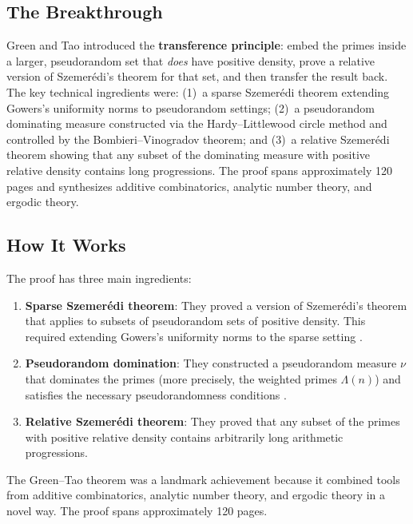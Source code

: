 \subsection{The Breakthrough}
Green and Tao introduced the \textbf{transference principle}: embed the primes inside a larger, pseudorandom set that \emph{does} have positive density, prove a relative version of Szemer\'edi's theorem for that set, and then transfer the result back. The key technical ingredients were: (1)~a sparse Szemer\'edi theorem extending Gowers's uniformity norms to pseudorandom settings; (2)~a pseudorandom dominating measure constructed via the Hardy--Littlewood circle method and controlled by the Bombieri--Vinogradov theorem; and (3)~a relative Szemer\'edi theorem showing that any subset of the dominating measure with positive relative density contains long progressions. The proof spans approximately 120 pages and synthesizes additive combinatorics, analytic number theory, and ergodic theory.

\subsection{How It Works}

The proof has three main ingredients:

\begin{enumerate}
\item \textbf{Sparse Szemer\'edi theorem}: They proved a version of Szemer\'edi's theorem that applies to subsets of pseudorandom sets of positive density. This required extending Gowers's uniformity norms to the sparse setting \cite{gowers2001}.
\item \textbf{Pseudorandom domination}: They constructed a pseudorandom measure $\nu$ that dominates the primes (more precisely, the weighted primes $\Lambda(n)$) and satisfies the necessary pseudorandomness conditions \cite{greentao2008}.
\item \textbf{Relative Szemer\'edi theorem}: They proved that any subset of the primes with positive relative density contains arbitrarily long arithmetic progressions.
\end{enumerate}

\begin{highlightbox}
The Green--Tao theorem was a landmark achievement because it combined tools from additive combinatorics, analytic number theory, and ergodic theory in a novel way. The proof spans approximately 120 pages.
\end{highlightbox}

